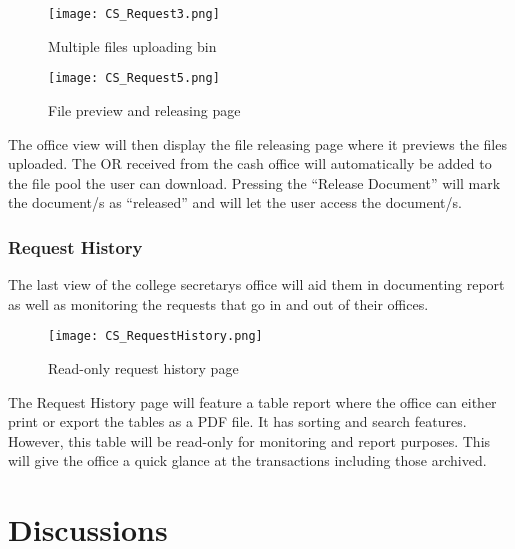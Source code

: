 \begin{figure}[h]
    \centering 
    \begin{minipage}[c]{0.5\linewidth}
        \centering
        \texttt{[image: CS\_Request3.png]}
        \caption{Multiple files uploading bin}
        \label{fig:CS_Request3}
    \end{minipage}
\end{figure}

\begin{figure}[h]
    \centering 
    \begin{minipage}[c]{0.5\linewidth}
        \centering
        \texttt{[image: CS\_Request5.png]}
        \caption{File preview and releasing page}
        \label{fig:CS_Request5}
    \end{minipage}
\end{figure}

The office view will then display the file releasing page where it previews the files uploaded. The OR received from the cash office will automatically be added to the file pool the user can download. Pressing the “Release Document” will mark the document/s as “released” and will let the user access the document/s.

\subsubsection{Request History}

The last view of the college secretary\textsc{}s office will aid them in documenting report as well as monitoring the requests that go in and out of their offices.

\begin{figure}[h]
    \centering 
    \begin{minipage}[c]{0.5\linewidth}
        \centering
        \texttt{[image: CS\_RequestHistory.png]}
        \caption{Read-only request history page}
        \label{fig:CS_RequestHistory}
    \end{minipage}
\end{figure}

The Request History page will feature a table report where the office can either print or export the tables as a PDF file. It has sorting and search features. However, this table will be read-only for monitoring and report purposes. This will give the office a quick glance at the transactions including those archived.

\section{Discussions}

